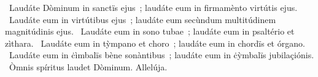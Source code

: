 ~Laudáte Dòminum in sanctïs ejus~; laudáte eum in firmamènto virtútis ejus. 
~Laudáte eum in virtútibus ejus~; laudáte eum secùndum multitúdinem magnitúdinis ejus. 
~Laudáte eum in sono tubae~; laudáte eum in psaltério et zìthara. 
~Laudáte eum in tỳmpano et choro~; laudáte eum in chordïs et órgano. 
~Laudáte eum in ċìmbalïs bène sonàntibus~; laudáte eum in ċỳmbalïs jubilaçiónis. 
~Òmnis spíritus laudet Dòminum. Allelúja. 
